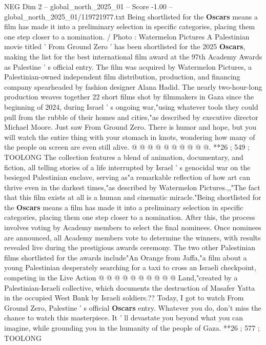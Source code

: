\begin{textsample}{NEG Dim 2 – global\_north\_2025\_01 – Score -1.00 – global\_north\_2025\_01/119721977.txt}  \label{ex:f2_neg_044}
Being shortlisted for the \textbf{Oscars} means a film has made it into a preliminary selection in specific categories, placing them one step closer to a nomination. / Photo : Watermelon Pictures A Palestinian movie titled ' From Ground Zero ' has been shortlisted for the 2025 \textbf{Oscars}, making the list for the best international film award at the 97th Academy Awards as Palestine ' s official entry.
The film was acquired by Watermelon Pictures, a Palestinian-owned independent film distribution, production, and financing company spearheaded by fashion designer Alana Hadid.
The nearly two-hour-long production weaves together 22 short films shot by filmmakers in Gaza since the beginning of 2024, during Israel ' s ongoing war,"using whatever tools they could pull from the rubble of their homes and cities,"as described by executive director Michael Moore.
Just saw From Ground Zero.
There is humor and hope, but you will watch the entire thing with your stomach in knots, wondering how many of the people on screen are even still alive. @ @ @ @ @ @ @ @ @ @. **26 ; 549 ; TOOLONG The collection features a blend of animation, documentary, and fiction, all telling stories of a life interrupted by Israel ' s genocidal war on the besieged Palestinian enclave, serving as"a remarkable reflection of how art can thrive even in the darkest times,"as described by Watermelon Pictures.,,"The fact that this film exists at all is a human and cinematic miracle."Being shortlisted for the \textbf{Oscars} means a film has made it into a preliminary selection in specific categories, placing them one step closer to a nomination.
After this, the process involves voting by Academy members to select the final nominees.
Once nominees are announced, all Academy members vote to determine the winners, with results revealed live during the prestigious awards ceremony.
The two other Palestinian films shortlisted for the awards include"An Orange from Jaffa,"a film about a young Palestinian desperately searching for a taxi to cross an Israeli checkpoint, competing in the Live Action @ @ @ @ @ @ @ @ @ @ Land,"created by a Palestinian-Israeli collective, which documents the destruction of Masafer Yatta in the occupied West Bank by Israeli soldiers.??
Today, I got to watch From Ground Zero, Palestine ' s official \textbf{Oscars} entry.
Whatever you do, don't miss the chance to watch this masterpiece.
It ' ll devastate you beyond what you can imagine, while grounding you in the humanity of the people of Gaza. **26 ; 577 ; TOOLONG

\end{textsample}

